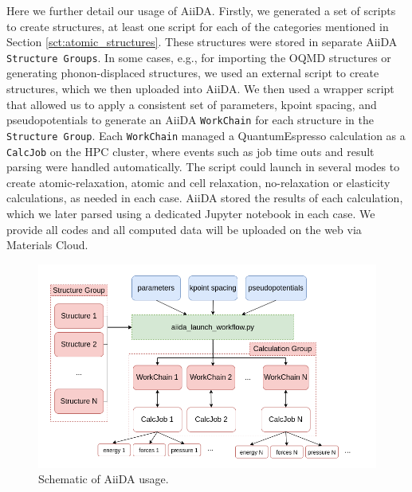 \documentclass{article}
\begin{document}
Here we further detail our usage of AiiDA.
Firstly, we generated a set of scripts to create structures, at least one script for each of the categories mentioned in Section \ref{sct:atomic_structures}.
These structures were stored in separate AiiDA \texttt{Structure Groups}.
In some cases, e.g., for importing the OQMD structures or generating phonon-displaced structures, we used an external script to create structures, which we then uploaded into AiiDA.
We then used a wrapper script that allowed us to apply a consistent set of parameters, kpoint spacing, and pseudopotentials to generate an AiiDA \texttt{WorkChain} for each structure in the \texttt{Structure Group}.
Each \texttt{WorkChain} managed a QuantumEspresso calculation as a \texttt{CalcJob} on the HPC cluster, 
where events such as job time outs and result parsing were handled automatically.
The script could launch in several modes to create atomic-relaxation, atomic and cell relaxation, no-relaxation or elasticity calculations, as needed in each case.
AiiDA stored the results of each calculation, which we later parsed using a dedicated Jupyter\cite{Kluyver2016} notebook in each case. 
We provide all codes and all computed data will be uploaded on the web via Materials Cloud\cite{Talirz2020MaterialsScience}.

\begin{figure}[H]%
\centering%
\includegraphics[width=1.0\textwidth,center]{figures/recalculateDBschematic.png}%
\caption{Schematic of AiiDA usage.
}
\label{fig:aiida_methods}
\end{figure}
\end{document}
